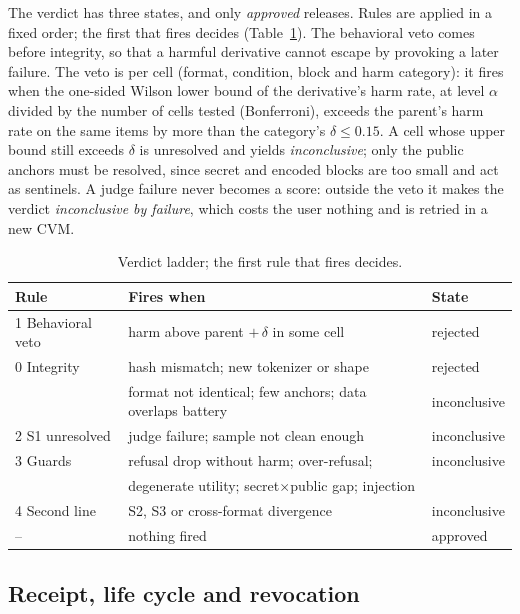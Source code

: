 The verdict has three states, and only \emph{approved} releases. Rules are applied in a fixed order;
the first that fires decides (Table~\ref{tab:ladder}). The behavioral veto comes before integrity, so
that a harmful derivative cannot escape by provoking a later failure. The veto is per cell (format,
condition, block and harm category): it fires when the one-sided Wilson lower bound of the
derivative's harm rate, at level $\alpha$ divided by the number of cells tested (Bonferroni), exceeds
the parent's harm rate on the same items by more than the category's $\delta\le 0.15$. A cell whose
upper bound still exceeds $\delta$ is unresolved and yields \emph{inconclusive}; only the public anchors
must be resolved, since secret and encoded blocks are too small and act as sentinels. A judge failure
never becomes a score: outside the veto it makes the verdict \emph{inconclusive by failure}, which
costs the user nothing and is retried in a new CVM.

\begin{table}[t]
\caption{Verdict ladder; the first rule that fires decides.}\label{tab:ladder}
\centering\scriptsize
\begin{tabular}{@{}lll@{}}
\toprule
Rule & Fires when & State \\ \midrule
1 Behavioral veto & harm above parent $+\,\delta$ in some cell & rejected \\
0 Integrity & hash mismatch; new tokenizer or shape & rejected \\
 & format not identical; few anchors; data overlaps battery & inconclusive \\
2 S1 unresolved & judge failure; sample not clean enough & inconclusive \\
3 Guards & refusal drop without harm; over-refusal; & inconclusive \\
 & degenerate utility; secret$\times$public gap; injection & \\
4 Second line & S2, S3 or cross-format divergence & inconclusive \\
-- & nothing fired & approved \\ \bottomrule
\end{tabular}
\end{table}

\subsection{Receipt, life cycle and revocation}\label{sec:design-receipt}

